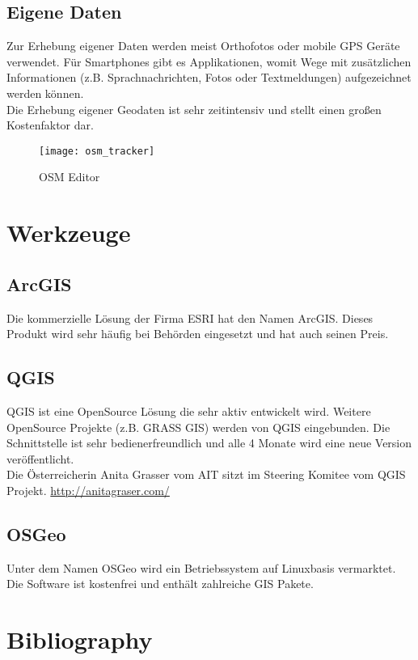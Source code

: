 \documentclass[11pt,fleqn]{book} %
\begin{document}
\section{Eigene Daten}
Zur Erhebung eigener Daten werden meist Orthofotos oder mobile GPS Ger\"ate verwendet. F\"ur Smartphones gibt es Applikationen, womit Wege mit zus\"atzlichen Informationen (z.B. Sprachnachrichten, Fotos oder Textmeldungen) aufgezeichnet werden k\"onnen.  \\
Die Erhebung eigener Geodaten ist sehr zeitintensiv und stellt einen gro{\ss}en Kostenfaktor dar.


\begin{figure}[h]
\centering\texttt{[image: osm\_tracker]}
\caption{OSM Editor}
\end{figure}

\chapter{Werkzeuge}
\section{ArcGIS}
Die kommerzielle L\"osung der Firma ESRI hat den Namen ArcGIS. Dieses Produkt wird sehr h\"aufig bei Beh\"orden eingesetzt und hat auch seinen Preis. 
\section{QGIS}
QGIS ist eine OpenSource L\"osung die sehr aktiv entwickelt wird. Weitere OpenSource Projekte (z.B. GRASS GIS) werden von QGIS eingebunden. 
Die Schnittstelle ist sehr bedienerfreundlich und alle 4 Monate wird eine neue Version ver\"offentlicht.
\\
Die \"Osterreicherin Anita Grasser vom AIT sitzt im Steering Komitee vom QGIS Projekt.
\url{http://anitagraser.com/}
\section{OSGeo}
Unter dem Namen OSGeo wird ein Betriebssystem auf Linuxbasis vermarktet. Die Software ist kostenfrei und enth\"alt zahlreiche GIS Pakete.




\chapter*{Bibliography}
\end{document}
